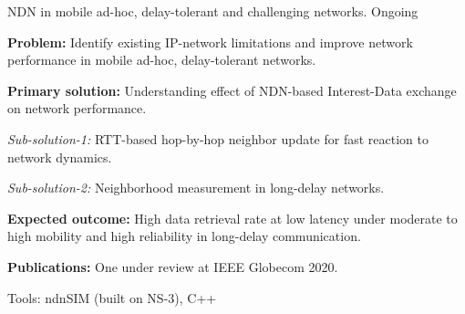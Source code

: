 

\begin{cventries}

\cventry
  {} %
  {NDN in mobile ad-hoc, delay-tolerant and challenging networks.} %
  {Ongoing} %
  {} %
  {
    \vspace{-3mm}
    \begin{cvitems} %
      \item {\textbf{Problem:} Identify existing IP-network limitations and improve network performance in mobile ad-hoc, delay-tolerant networks.}
      \item {\textbf{Primary solution:} Understanding effect of NDN-based Interest-Data exchange on network performance.}
      \item {\textit{Sub-solution-1:} RTT-based hop-by-hop neighbor update for fast reaction to network dynamics.}
      \item {\textit{Sub-solution-2:} Neighborhood measurement in long-delay networks.}
      \item {\textbf{Expected outcome:} High data retrieval rate at low latency under moderate to high mobility and high reliability in long-delay communication.}
      \item {\textbf{Publications:} One under review at IEEE Globecom 2020.}
      \item {Tools: ndnSIM (built on NS-3), C++}
    \end{cvitems}
  }
  {}



\end{cventries}
